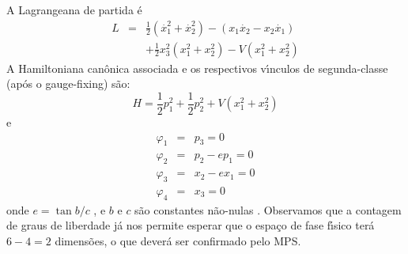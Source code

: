 \documentclass[a4paper,thmsa,12pt]{report}
\begin{document}
A Lagrangeana de partida \'{e} 
\begin{eqnarray}
L &=&\frac{1}{2}\left( \stackrel{.}{x}_{1}^{2}+\stackrel{.}{x}%
_{2}^{2}\right) -\left( x_{1}\stackrel{.}{x}_{2}-x_{2}\stackrel{.}{x}%
_{1}\right) \\
&&+\frac{1}{2}x_{3}^{2}\left( x_{1}^{2}+x_{2}^{2}\right)
-V(x_{1}^{2}+x_{2}^{2})  \label{2.1}
\end{eqnarray}
A Hamiltoniana can\^{o}nica associada e os respectivos v\'{\i}nculos de
segunda-classe (ap\'{o}s o gauge-fixing) s\~{a}o: 
\begin{equation}
H=\frac{1}{2}p_{1}^{2}+\frac{1}{2}p_{2}^{2}+V(x_{1}^{2}+x_{2}^{2})
\label{2.2}
\end{equation}
e 
\begin{eqnarray}
\varphi _{1} &=&p_{3}=0  \label{2.2a} \\
\varphi _{2} &=&p_{2}-ep_{1}=0  \label{2.2b} \\
\varphi _{3} &=&x_{2}-ex_{1}=0  \label{2.2c} \\
\varphi _{4} &=&x_{3}=0  \label{2.2d}
\end{eqnarray}
onde $e=\tan b/c$ , e $b$ e $c$ s\~{a}o constantes n\~{a}o-nulas \cite
{costa-girotti}. Observamos que a contagem de graus de liberdade j\'{a} nos
permite esperar que o espa\c{c}o de fase f\'{\i}sico ter\'{a} $6-4=2$
dimens\~{o}es, o que dever\'{a} ser confirmado pelo MPS.
\end{document}
